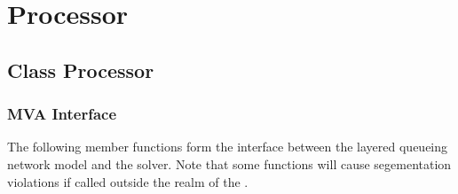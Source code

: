 % 
% 
\section{Processor}
\label{sec:processor}

\subsection{Class Processor}

\subsubsection{MVA Interface}
\label{sec:processor-mva}

The following member functions form the interface between the layered
queueing network model and the  solver.  Note that
some functions will cause segementation violations if called outside
the realm of the .

